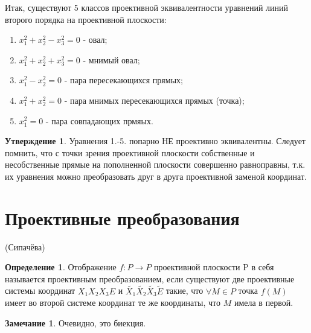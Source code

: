 \documentclass[a4paper, 12pt]{article}
\theoremstyle{definition}
\newtheorem*{definition}{Определение}
\newtheorem*{subtheorem}{Утверждение}
\newtheorem*{remark}{Замечание}
\begin{document}
Итак, существуют 5 классов проективной эквивалентности уравнений линий второго порядка на проективной плоскости:
\begin{enumerate}
    \item $x_1^2 + x_2^2 - x_3^2 = 0$ - овал;
    \item $x_1^2 + x_2^2 + x_3^2 = 0$ - мнимый овал;
    \item $x_1^2 - x_2^2 = 0$ - пара пересекающихся прямых;
    \item $x_1^2 + x_2^2 = 0$ - пара мнимых пересекающихся прямых (точка);
    \item $x_1^2 = 0$ - пара совпадающих прмяых.
\end{enumerate}

\begin{subtheorem}
    Уравнения 1.-5. попарно НЕ проективно эквивалентны. Следует помнить, что с точки зрения проективной плоскости собственные и несобственные прямые на пополненной плоскости совершенно равноправны, т.к. их уравнения можно преобразовать друг в друга проективной заменой координат.
\end{subtheorem}


\section{ Проективные преобразования}
(Сипачёва)
\begin{definition}
    Отображение $f: P \to P$ проективной плоскости P в себя называется проективным преобразованием, если существуют две проективные системы координат $X_1X_2X_3E$ и $\tilde{X_1}\tilde{X_2}\tilde{X_3}\tilde{E}$ такие, что $\forall M \in P$ точка $f(M)$ имеет во второй системе координат те же координаты, что $M$ имела в первой.
\end{definition}
\begin{remark}
    Очевидно, это биекция.
\end{remark}
\end{document}
